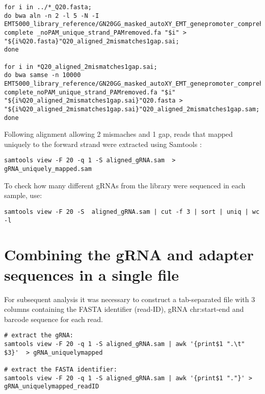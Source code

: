 \begin{small}\begin{lstlisting}
for i in ../*_Q20.fasta;
do bwa aln -n 2 -l 5 -N -I EMT5000_library_reference/GN20GG_masked_autoXY_EMT_genepromoter_comprehensive_
complete _noPAM_unique_strand_PAMremoved.fa "$i" > "${i%Q20.fasta}"Q20_aligned_2mismatches1gap.sai;
done

for i in *Q20_aligned_2mismatches1gap.sai;
do bwa samse -n 10000 EMT5000_library_reference/GN20GG_masked_autoXY_EMT_genepromoter_comprehensive_
complete_noPAM_unique_strand_PAMremoved.fa "$i" "${i%Q20_aligned_2mismatches1gap.sai}"Q20.fasta > "${i%Q20_aligned_2mismatches1gap.sai}"Q20_aligned_2mismatches1gap.sam;
done
\end{lstlisting}\end{small}

Following alignment allowing 2 mismaches and 1 gap, reads that mapped uniquely to the forward strand were extracted using Samtools \cite{Li:2009kaa}:

\begin{small}\begin{lstlisting}
samtools view -F 20 -q 1 -S aligned_gRNA.sam  > gRNA_uniquely_mapped.sam
\end{lstlisting}\end{small}

To check how many different gRNAs from the library were sequenced in each sample, use:

\begin{small}\begin{lstlisting}
samtools view -F 20 -S  aligned_gRNA.sam | cut -f 3 | sort | uniq | wc -l
\end{lstlisting}\end{small}


\section{Combining the gRNA and adapter sequences in a single file}

For subsequent analysis it was necessary to construct a tab-separated file with 3 columns containing the FASTA identifier (read-ID), gRNA chr:start-end and barcode sequence for each read.

\begin{small}\begin{lstlisting}
# extract the gRNA:
samtools view -F 20 -q 1 -S aligned_gRNA.sam | awk '{print$1 ".\t" $3}'  > gRNA_uniquelymapped

# extract the FASTA identifier:
samtools view -F 20 -q 1 -S aligned_gRNA.sam | awk '{print$1 "."}' > gRNA_uniquelymapped_readID
\end{lstlisting}\end{small}

